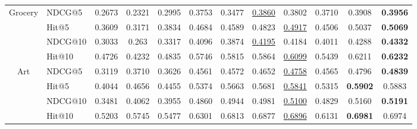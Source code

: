 \documentclass[sigconf]{acmart}
\begin{document}
\begin{table}[t]
{\begin{tabular}{c|l|cccc|ccc|ccc}
\multirow{4}{*}{Grocery} & NDCG@5                                       & 0.2673    & 0.2321   & 0.2995     & 0.3753   & 0.3477                 & \underline{0.3860}       & 0.3802              & 0.3710               & 0.3908                                  & \textbf{0.3956}          \\
                         & Hit@5                                        & 0.3609    & 0.3171   & 0.3834     & 0.4684   & 0.4589                 & 0.4823                   & \underline{0.4917}  & 0.4506               & 0.5037                                  & \textbf{0.5069}          \\
                         & NDCG@10                                      & 0.3033    & 0.263    & 0.3317     & 0.4096   & 0.3874                 & \underline{0.4195}       & 0.4184              & 0.4011               & 0.4288                                  & \textbf{0.4332}          \\
                         & Hit@10                                       & 0.4726    & 0.4232   & 0.4835     & 0.5746   & 0.5815                 & 0.5864                   & \underline{0.6099}  & 0.5439               & 0.6211                                  & \textbf{0.6232}          \\ \midrule
\multirow{4}{*}{Art}     & NDCG@5                                       & 0.3119    & 0.3710   & 0.3626     & 0.4561   & 0.4572                 & 0.4652                   & \underline{0.4758}  & 0.4565               & 0.4796                                  & \textbf{0.4839}          \\
                         & Hit@5                                        & 0.4044    & 0.4656   & 0.4455     & 0.5374   & 0.5663                 & 0.5681                   & \underline{0.5841}  & 0.5315               & \textbf{0.5902}                                  & 0.5883          \\
                         & NDCG@10                                      & 0.3481    & 0.4062   & 0.3955     & 0.4860   & 0.4944                 & 0.4981                   & \underline{0.5100}  & 0.4829               & 0.5160                                  & \textbf{0.5191}          \\
                         & Hit@10                                       & 0.5203    & 0.5745   & 0.5477     & 0.6301   & 0.6813                 & 0.6877                   & \underline{0.6896}  & 0.6131               & \textbf{0.6981}                         & 0.6974                   \\ \midrule

\end{tabular}}
\end{table}
\end{document}
